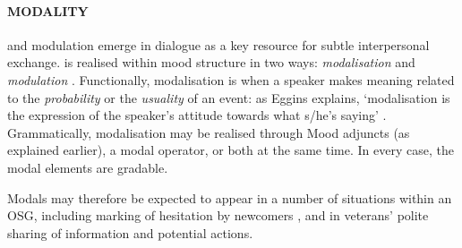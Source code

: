 
\paragraph{MODALITY} \label{sect:modality}

 and modulation emerge in dialogue as a key resource for subtle interpersonal exchange.  is realised within mood structure in two ways: \emph{modalisation} and \emph{modulation} \cite[p.~179]{eggins_introduction_2004}. Functionally, modalisation is when a speaker makes meaning related to the \emph{probability} or the \emph{usuality} of an event: as Eggins explains, `modalisation is the expression of the speaker's attitude towards what s/he's saying' \citeyear[p.~180]{eggins_introduction_2004}. Grammatically, modalisation may be realised through Mood adjuncts (as explained earlier), a modal operator, or both at the same time. In every case, the modal elements are gradable. 

\setlength{\columnsep}{-5mm}
\begin{multicols}{3}\raggedright{
\begin{quote}

\end{quote}
\begin{quote}

\end{quote}
\begin{quote}

\end{quote}
}
\end{multicols}
%
Modals may therefore be expected to appear in a number of situations within an \gls{OSG}, including marking of hesitation by newcomers \cite{vayreda_social_2009,weber_missed_2011}, and in veterans' polite sharing of information and potential actions.

